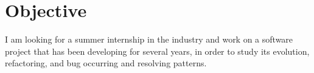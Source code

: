 
\section{Objective}
I am looking for a summer internship in the industry and work on a software project that has been developing for several years, in order to study its evolution, refactoring, and bug occurring and resolving patterns.
